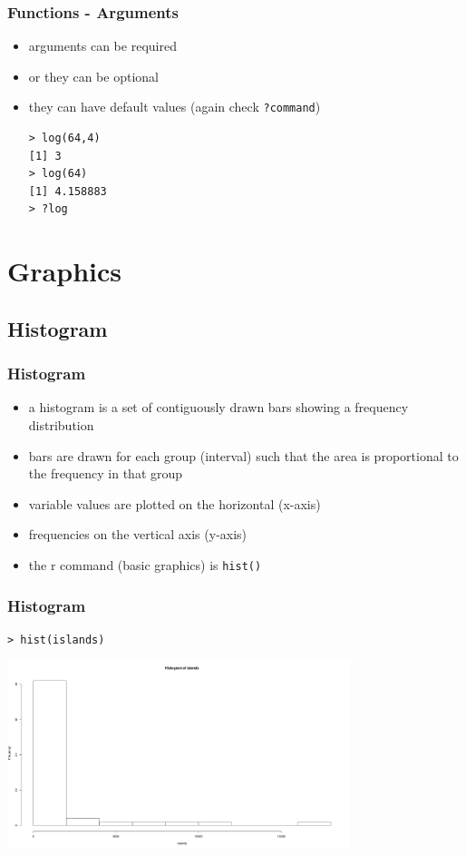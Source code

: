 \documentclass[xcolor={table},c]{beamer}
\begin{document}
\begin{frame}[fragile]\frametitle{Functions - Arguments}
  \begin{itemize}
  \item arguments can be required
  \item or they can be optional
  \item they can have default values (again check \texttt{?command})
\begin{verbatim}
> log(64,4)
[1] 3 
> log(64)
[1] 4.158883
> ?log
\end{verbatim}
   \end{itemize}
\end{frame}

\section{Graphics}
\subsection{Histogram}
\begin{frame}[fragile]\frametitle{Histogram}
  \begin{itemize}
  \item a histogram is a set of contiguously drawn bars showing a frequency distribution
  \item bars are drawn for each group (interval) such that the area is proportional to the frequency in that group
  \item variable values are plotted on the horizontal (x-axis)
  \item frequencies on the vertical axis (y-axis)
  \item the r command (basic  graphics) is \texttt{hist()}
  \end{itemize}
\end{frame}

\begin{frame}[fragile]\frametitle{Histogram}
\begin{center}
\begin{verbatim}
> hist(islands)
\end{verbatim}
  \includegraphics[width=10cm]{hist1.png}
\end{center}
\end{frame}
\end{document}
